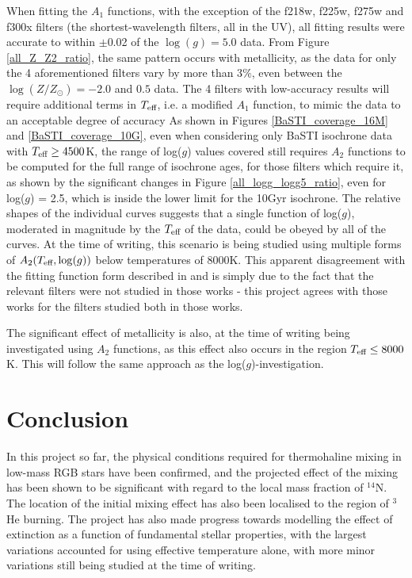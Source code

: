 \documentclass[12pt, a4paper]{report}
\begin{document}
When fitting the $A_{1}$ functions, with the exception of the f218w, f225w, f275w and f300x filters (the shortest-wavelength filters, all in the UV), all fitting results were accurate to within $\pm$0.02 of the $\log(g) = 5.0$ data. From Figure \ref{all_Z_Z2_ratio}, the same pattern occurs with metallicity, as the data for only the 4 aforementioned filters vary by more than 3$\%$, even between the $\log(Z/Z_{\odot}) = -2.0$ and $0.5$ data.
The 4 filters with low-accuracy results will require additional terms in $T_{\textnormal{eff}}$, i.e. a modified  $A_{1}$ function, to mimic the data to an acceptable degree of accuracy
As shown in Figures \ref{BaSTI_coverage_16M} and \ref{BaSTI_coverage_10G}, even when considering only BaSTI isochrone data with $T_{\textnormal{eff}} \geq 4500$K, the range of log($g$) values covered still requires $A_{2}$ functions to be computed for the full range of isochrone ages, for those filters which require it, as shown by the significant changes in Figure \ref{all_logg_logg5_ratio}, even for log($g$) = 2.5, which is inside the lower limit for the 10Gyr isochrone. The relative shapes of the individual curves suggests that a single function of log($g$), moderated in magnitude by the $T_{\textnormal{eff}}$ of the data, could be obeyed by all of the curves. At the time of writing, this scenario is being studied using multiple forms of $A_{2}(T_{\textnormal{eff}},\log(g))$ below temperatures of 8000K. This apparent disagreement with the fitting function form described in \cite{2018MNRAS.475.5023C} and \cite{2018MNRAS.479L.102C} is simply due to the fact that the relevant filters were not studied in those works - this project agrees with those works for the filters studied both in those works.

The significant effect of metallicity is also, at the time of writing being investigated using $A_{2}$ functions, as this effect also occurs in the region $T_{\textnormal{eff}} \leq 8000$K. This will follow the same approach as the log($g$)-investigation.

\section{Conclusion}
In this project so far, the physical conditions required for thermohaline mixing in low-mass RGB stars have been confirmed, and the projected effect of the mixing has been shown to be significant with regard to the local mass fraction of $^{14}$N. The location of the initial mixing effect has also been localised to the region of $^{3}$He burning.
The project has also made progress towards modelling the effect of extinction as a function of fundamental stellar properties, with the largest variations accounted for using effective temperature alone, with more minor variations still being studied at the time of writing.
\end{document}
